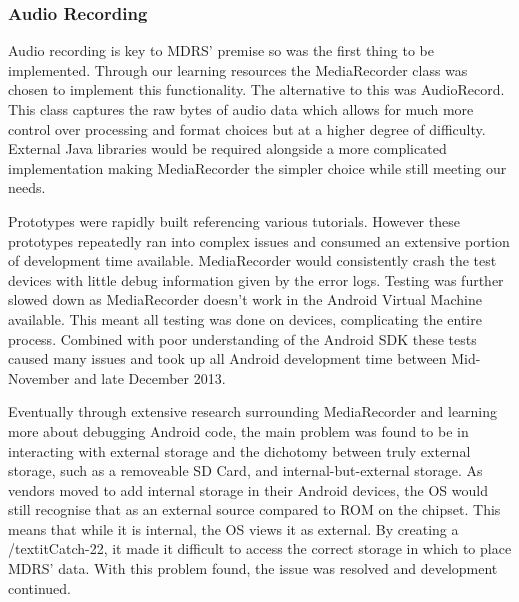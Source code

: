 \documentclass{l3proj}
\begin{document}
\subsubsection{Audio Recording}    Audio recording is key to MDRS' premise so was the first thing to be implemented. Through our learning resources the MediaRecorder class was chosen to implement this functionality. The alternative to this was AudioRecord. This class captures the raw bytes of audio data which allows for much more control over processing and format choices but at a higher degree of difficulty. External Java libraries would be required alongside a more complicated implementation making MediaRecorder the simpler choice while still meeting our needs.

Prototypes were rapidly built referencing various tutorials. However these prototypes repeatedly ran into complex issues and consumed an extensive portion of development time available. MediaRecorder would consistently crash the test devices with little debug information given by the error logs. Testing was further slowed down as MediaRecorder doesn't work in the Android Virtual Machine available. This meant all testing was done on devices, complicating the entire process. Combined with poor understanding of the Android SDK these tests caused many issues and took up all Android development time between Mid-November and late December 2013.

Eventually through extensive research surrounding MediaRecorder and learning more about debugging Android code, the main problem was found to be in interacting with external storage and the dichotomy between truly external storage, such as a removeable SD Card, and internal-but-external storage. As vendors moved to add internal storage in their Android devices, the OS would still recognise that as an external source compared to ROM on the chipset. This means that while it is internal, the OS views it as external. By creating a /textit{Catch-22}, it made it difficult to access the correct storage in which to place MDRS' data. With this problem found, the issue was resolved and development continued.
\end{document}
